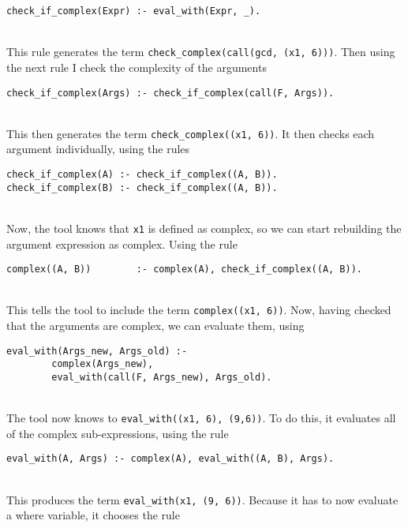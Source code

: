 \begin{lstlisting}
check_if_complex(Expr) :- eval_with(Expr, _).
\end{lstlisting}
\mbox{} \\
This rule generates the term \lstinline{check_complex(call(gcd, (x1, 6)))}. Then using the next rule I check the complexity of the arguments \\ %

\begin{lstlisting}
check_if_complex(Args) :- check_if_complex(call(F, Args)).
\end{lstlisting}
\mbox{} \\
This then generates the term \lstinline{check_complex((x1, 6))}. It then checks each argument individually, using the rules  \\ %

\begin{lstlisting}
check_if_complex(A) :- check_if_complex((A, B)).
check_if_complex(B) :- check_if_complex((A, B)).
\end{lstlisting}
\mbox{} \\
Now, the tool knows that \lstinline{x1} is defined as complex, so we can start rebuilding the argument expression as complex. Using the rule  \\ %

\begin{lstlisting}
complex((A, B))        :- complex(A), check_if_complex((A, B)).
\end{lstlisting}
\mbox{} \\
This tells the tool to include the term \lstinline{complex((x1, 6))}. Now, having checked that the arguments are complex, we can evaluate them, using \\ %

\begin{lstlisting}
eval_with(Args_new, Args_old) :- 
		complex(Args_new), 
		eval_with(call(F, Args_new), Args_old).
\end{lstlisting}
\mbox{} \\
The tool now knows to \lstinline{eval_with((x1, 6), (9,6))}. To do this, it evaluates all of the complex sub-expressions, using the rule \\ %

\begin{lstlisting}
eval_with(A, Args) :- complex(A), eval_with((A, B), Args).
\end{lstlisting}
\mbox{} \\
This produces the term \lstinline{eval_with(x1, (9, 6))}. Because it has to now evaluate a where variable, it chooses the rule \\ %

